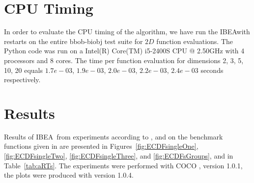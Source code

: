 \documentclass{sig-alternate}
\renewcommand{\algname}{IBEA}  %
\begin{document}
\section{CPU Timing}
In order to evaluate the CPU timing of the algorithm, we have run the \algname with restarts on the entire bbob-biobj test suite \cite{biobj2016func} for $2 D$ function evaluations. The Python code was run on a Intel(R) Core(TM) i5-2400S CPU @ 2.50GHz with 4 processors and 8 cores. The time per function evaluation for dimensions 2, 3, 5, 10, 20 equals $1.7e-03$, $1.9e-03$, $2.0e-03$, $2.2e-03$, $2.4e-03$ seconds respectively. 


\section{Results}

Results of \algname\ from experiments according to \cite{hansen2016exp}, \cite{hansen2016perfass} and \cite{biobj2016perfass} on the benchmark
functions given in \cite{biobj2016func} are presented in
Figures~\ref{fig:ECDFsingleOne}, \ref{fig:ECDFsingleTwo}, \ref{fig:ECDFsingleThree}, and \ref{fig:ECDFsGroups}, and in
Table~\ref{tab:aRTs}. The experiments were performed with COCO \cite{hansen2016cocoplat}, version 1.0.1, the plots were produced with version 1.0.4.


\end{document}
